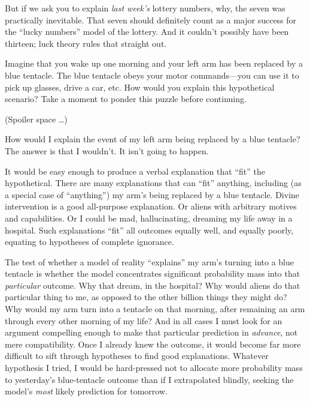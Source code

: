 {
 But if we ask you to explain \textit{last week's}
lottery numbers, why, the seven was practically inevitable. That seven
should definitely count as a major success for the
``lucky numbers'' model of the
lottery. And it couldn't possibly have been thirteen;
luck theory rules that straight out.}

\hr

{
 Imagine that you wake up one morning and your left arm has been
replaced by a blue tentacle. The blue tentacle obeys your motor
commands---you can use it to pick up glasses, drive a car, etc. How
would you explain this hypothetical scenario? Take a moment to ponder
this puzzle before continuing.}

{
 (Spoiler space \ldots)}

{
 How would I explain the event of my left arm being replaced by a
blue tentacle? The answer is that I wouldn't. It
isn't going to happen.}

{
 It would be easy enough to produce a verbal explanation that
``fit'' the hypothetical. There are
many explanations that can ``fit''
anything, including (as a special case of
``anything'') my
arm's being replaced by a blue tentacle. Divine
intervention is a good all-purpose explanation. Or aliens with
arbitrary motives and capabilities. Or I could be mad, hallucinating,
dreaming my life away in a hospital. Such explanations
``fit'' all outcomes equally well,
and equally poorly, equating to hypotheses of complete ignorance.}

{
 The test of whether a model of reality
``explains'' my
arm's turning into a blue tentacle is whether the model
concentrates significant probability mass into that \textit{particular}
outcome. Why that dream, in the hospital? Why would aliens do that
particular thing to me, as opposed to the other billion things they
might do? Why would my arm turn into a tentacle on that morning, after
remaining an arm through every other morning of my life? And in all
cases I must look for an argument compelling enough to make that
particular prediction in \textit{advance}, not mere compatibility. Once
I already knew the outcome, it would become far more difficult to sift
through hypotheses to find good explanations. Whatever hypothesis I
tried, I would be hard-pressed not to allocate more probability mass to
yesterday's blue-tentacle outcome than if I
extrapolated blindly, seeking the model's \textit{most}
likely prediction for tomorrow.}

